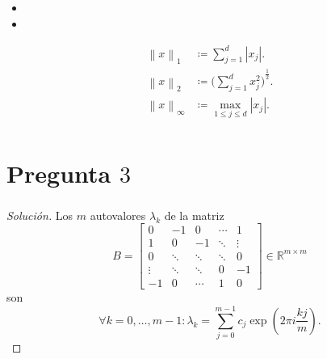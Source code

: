 \documentclass[aspectratio=1610,spanish,8pt]{beamer}
\begin{document}
\begin{frame}
    \frametitle{\secname}

    \begin{itemize}
        \item

              

        \item

              
    \end{itemize}

    \begin{definition}
        \begin{align*}
            \left\|x\right\|_{1}      & \coloneqq
            \sum_{j=1}^{d}\left|x_{j}\right|.                  \\
            \left\|x\right\|_{2}      & \coloneqq
            {\Big(\sum_{j=1}^{d}x^{2}_{j}\Big)}^{\frac{1}{2}}. \\
            \left\|x\right\|_{\infty} & \coloneqq
            \max_{1\leq j\leq d}\left|x_{j}\right|.            \\
        \end{align*}
    \end{definition}
\end{frame}

\section{Pregunta $3$}

\begin{frame}
    \frametitle{\secname}

    
\end{frame}

\begin{frame}
    \frametitle{\secname}
    \begin{proof}[Solución]
        Los $m$ autovalores $\lambda_{k}$ de la matriz
        \begin{equation*}
            B=
            \begin{bmatrix}
                0      & -1     & 0      & \cdots & 1      \\
                1      & 0      & -1     & \ddots & \vdots \\
                0      & \ddots & \ddots & \ddots & 0      \\
                \vdots & \ddots & \ddots & 0      & -1     \\
                -1     & 0      & \cdots & 1      & 0
            \end{bmatrix}\in\mathbb{R}^{m\times m}
        \end{equation*}
        son
        \begin{equation*}
            \forall k=0,\dotsc,m-1:
            \lambda_{k}=
            \sum_{j=0}^{m-1}
            c_{j}
            \exp
            \left(
            2\pi i\frac{kj}{m}
            \right).
        \end{equation*}
    \end{proof}
\end{frame}

\begin{frame}
    \frametitle{\secname}
\end{frame}
\end{document}
